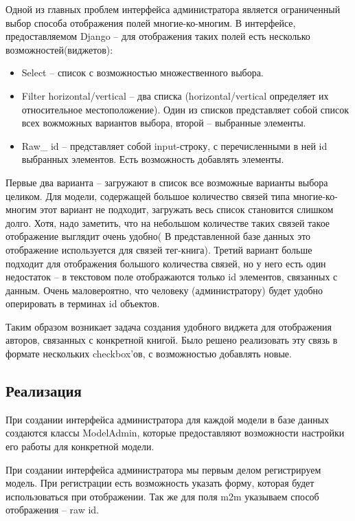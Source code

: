 \documentclass[a4paper]{report}
\begin{document}
Одной из главных проблем интерфейса администратора является ограниченный выбор способа отображения полей многие-ко-многим. В интерфейсе, предоставляемом Django -- для отображения таких полей есть несколько возможностей(виджетов):
\begin{itemize}
	\item Select -- список с возможностью множественного выбора.
	\item Filter horizontal/vertical -- два списка (horizontal/vertical определяет их относительное местоположение). Один из списков представляет собой список всех вожможных вариантов выбора, второй -- выбранные элементы.
	\item Raw\_ id -- представляет собой input-строку, с перечисленными в ней id выбранных элементов. Есть возможность добавлять элементы.
\end{itemize}
Первые два варианта -- загружают в список все возможные варианты выбора целиком. Для модели, содержащей большое количество связей типа многие-ко-многим этот вариант не подходит, \tk загружать весь список становится слишком долго. Хотя, надо заметить, что на небольшом количестве таких связей такое отображение выглядит очень удобно( В представленной базе данных это отображение используется для связей тег-книга). 
Третий вариант больше подходит для отображения большого количества связей, но у него есть один недостаток -- в текстовом поле отображаются только id элементов, связанных с данным. Очень маловероятно, что человеку (администратору) будет удобно оперировать в терминах id объектов.

Таким образом возникает задача создания удобного виджета для отображения авторов, связанных с конкретной книгой.
Было решено реализовать эту связь в формате нескольких checkbox'ов, с возможностью добавлять
новые.

\subsection{Реализация}

При создании интерфейса администратора для каждой модели в базе данных создаются классы ModelAdmin, которые предоставляют возможности настройки его работы для конкретной модели.

При создании интерфейса администратора мы первым делом регистрируем модель. При 
регистрации есть возможность указать форму, которая будет использоваться при
отображении. Так же для поля m2m указываем способ отображения -- raw id.
\end{document}
